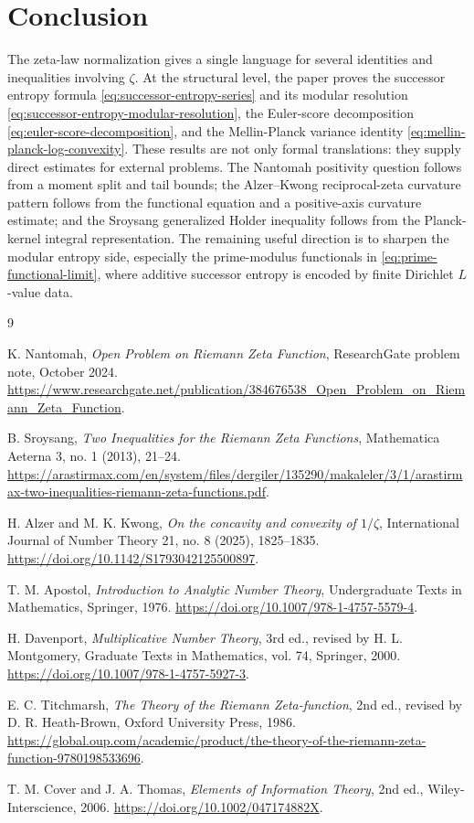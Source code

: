 \documentclass[11pt]{article}
\numberwithin{equation}{section}
\theoremstyle{definition}
\theoremstyle{remark}
\newcommand{\1}{\mathbf 1}
\begin{document}
\section{Conclusion}

The zeta-law normalization gives a single language for several identities and inequalities involving \(\zeta\).  At the structural level, the paper proves the successor entropy formula \eqref{eq:successor-entropy-series} and its modular resolution \eqref{eq:successor-entropy-modular-resolution}, the Euler-score decomposition \eqref{eq:euler-score-decomposition}, and the Mellin-Planck variance identity \eqref{eq:mellin-planck-log-convexity}.  These results are not only formal translations: they supply direct estimates for external problems.  The Nantomah positivity question follows from a moment split and tail bounds; the Alzer--Kwong reciprocal-zeta curvature pattern follows from the functional equation and a positive-axis curvature estimate; and the Sroysang generalized Holder inequality follows from the Planck-kernel integral representation.  The remaining useful direction is to sharpen the modular entropy side, especially the prime-modulus functionals in \eqref{eq:prime-functional-limit}, where additive successor entropy is encoded by finite Dirichlet \(L\)-value data.

\begin{thebibliography}{9}

K. Nantomah,
\emph{Open Problem on Riemann Zeta Function},
ResearchGate problem note, October 2024.
\url{https://www.researchgate.net/publication/384676538_Open_Problem_on_Riemann_Zeta_Function}.

B. Sroysang,
\emph{Two Inequalities for the Riemann Zeta Functions},
Mathematica Aeterna 3, no. 1 (2013), 21--24.
\url{https://arastirmax.com/en/system/files/dergiler/135290/makaleler/3/1/arastirmax-two-inequalities-riemann-zeta-functions.pdf}.

H. Alzer and M. K. Kwong,
\emph{On the concavity and convexity of \(1/\zeta\)},
International Journal of Number Theory 21, no. 8 (2025), 1825--1835.
\url{https://doi.org/10.1142/S1793042125500897}.

T. M. Apostol,
\emph{Introduction to Analytic Number Theory},
Undergraduate Texts in Mathematics, Springer, 1976.
\url{https://doi.org/10.1007/978-1-4757-5579-4}.

H. Davenport,
\emph{Multiplicative Number Theory},
3rd ed., revised by H. L. Montgomery, Graduate Texts in Mathematics, vol. 74, Springer, 2000.
\url{https://doi.org/10.1007/978-1-4757-5927-3}.

E. C. Titchmarsh,
\emph{The Theory of the Riemann Zeta-function},
2nd ed., revised by D. R. Heath-Brown, Oxford University Press, 1986.
\url{https://global.oup.com/academic/product/the-theory-of-the-riemann-zeta-function-9780198533696}.

T. M. Cover and J. A. Thomas,
\emph{Elements of Information Theory},
2nd ed., Wiley-Interscience, 2006.
\url{https://doi.org/10.1002/047174882X}.

\end{thebibliography}
\end{document}
